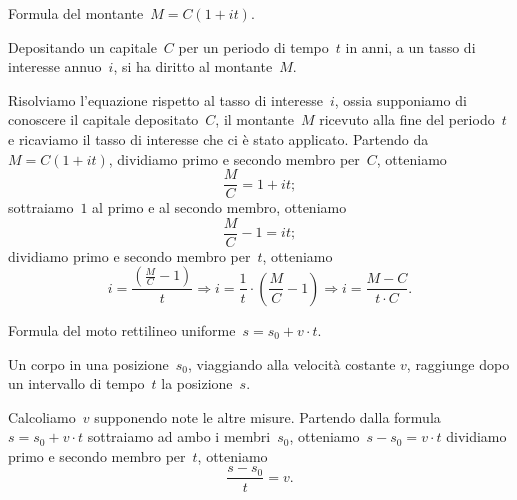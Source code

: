 \begin{esempio}{}{}
Formula del montante~\(M=C(1+it)\).

Depositando un capitale~\(C\) per un periodo di tempo~\(t\) in anni, a 
un tasso di interesse annuo~\(i\), si ha diritto al montante~\(M\).

Risolviamo l'equazione rispetto al tasso di interesse~\(i\), ossia 
supponiamo di conoscere il capitale depositato~\(C\), il montante~\(M\)
ricevuto alla fine del periodo~\(t\) e ricaviamo il tasso di interesse 
che ci è stato applicato.
Partendo da~\(M=C(1+it)\), dividiamo primo e secondo membro per~\(C\), 
otteniamo 
\[\frac{M}{C}=1+it;\]
sottraiamo~\(1\) al primo e al secondo membro, otteniamo
\[\frac{M}{C}-1=it;\] dividiamo primo e secondo membro per~\(t\),
otteniamo
\[i=\frac{\left(\frac{M}{C}-1\right)}{t}\Rightarrow%
i=\frac{1}{t}\cdot \left(\frac{M}{C}-1\right)\Rightarrow 
i=\frac{M-C}{t\cdot C}.\]
\end{esempio}

\begin{esempio}{}{}
Formula del moto rettilineo uniforme~\(s=s_{0}+v\cdot t\).

Un corpo in una posizione~\(s_0\), viaggiando alla velocità costante 
\(v\), raggiunge dopo un intervallo di tempo~\(t\) la posizione~\(s\).

Calcoliamo~\(v\) supponendo note le altre misure.
Partendo dalla formula~\(s=s_{0}+v\cdot t\) 
sottraiamo ad ambo i membri~\(s_0\), 
otteniamo~\(s-s_{0}=v\cdot t\)
dividiamo primo e secondo membro per~\(t\), otteniamo 
\[\frac{s-s_{0}}{t}=v.\]
\end{esempio}


% 

